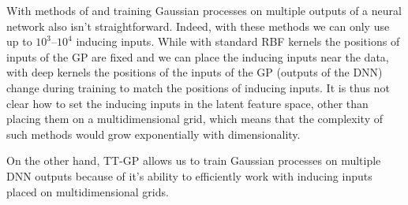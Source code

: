   With methods of \citet{hensman2013} and \citet{hensman2015} training Gaussian
  processes on multiple outputs of a neural network also isn't straightforward. Indeed,
  with these methods we can only use up to $10^3$--$10^4$ inducing inputs. While
  with standard RBF kernels the positions of inputs of the GP are fixed and we can place 
  the inducing inputs near the data, with deep kernels the positions of the
  inputs of the GP (outputs of the DNN) change during training to match the positions of inducing inputs.
  It is thus not clear how to set the inducing inputs in the latent feature space, other
  than placing them on a multidimensional grid, which means that the complexity
  of such methods would grow exponentially with dimensionality.

  On the other hand, TT-GP allows us to train Gaussian processes on multiple DNN
  outputs because of it's ability to efficiently work with inducing inputs 
  placed on multidimensional grids.
